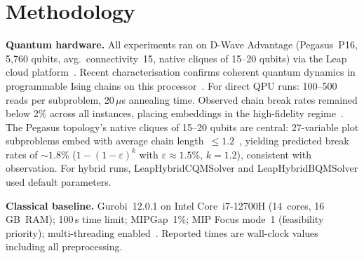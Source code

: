 \documentclass[conference]{IEEEtran}
\begin{document}
\section{Methodology}
\label{sec:Methodology}
\textbf{Quantum hardware.}
All experiments ran on D-Wave Advantage (Pegasus~P16, 5{,}760 qubits, avg.\ connectivity~15, native cliques of 15--20 qubits) via the Leap cloud platform~\cite{dwave2020advantage, dwave2022pegasus, dwave_hybrid_solver}.
Recent characterisation confirms coherent quantum dynamics in programmable Ising chains on this processor~\cite{king2022coherent}.
For direct QPU runs: 100--500 reads per subproblem, 20\,$\mu$s annealing time.
Observed chain break rates remained below 2\% across all instances, placing embeddings in the high-fidelity regime~\cite{cai2014practical, zbinden2020embedding, VAL16, vinci2015quantum}.
The Pegasus topology's native cliques of 15--20 qubits are central: 27-variable plot subproblems embed with average chain length~${\leq}1.2$~\cite{BBRR20, boothby2020next}, yielding predicted break rates of ${\sim}1.8\%$ ($1{-}(1{-}\varepsilon)^{k}$ with $\varepsilon{\approx}1.5\%$, $k{=}1.2$), consistent with observation.
For hybrid runs, LeapHybridCQMSolver and LeapHybridBQMSolver used default parameters.



\textbf{Classical baseline.}
Gurobi~12.0.1 on Intel Core~i7-12700H (14~cores, 16\,GB~RAM); 100\,s time limit; MIPGap~1\%; MIP Focus mode~1 (feasibility priority); multi-threading enabled~\cite{wolsey1998integer}.
Reported times are wall-clock values including all preprocessing.
\end{document}
